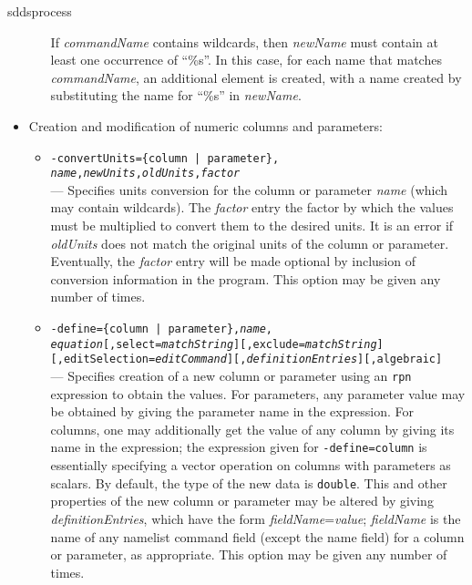 \begin{sddsprog}{sddsprocess}
\begin{itemize}
\begin{itemize}
        If {\em commandName} contains wildcards, then {\em newName} must contain at least one occurrence of
``\%s''.   In this case, for each name that matches {\em commandName}, an additional element is created, with a
name created by substituting the name for ``\%s'' in {\em newName}.

 
         \end{itemize}
 
    \item Creation and modification of numeric columns and parameters: \\

        \begin{itemize}

        \item {\tt -convertUnits=\{column | parameter\},{\em
name},{\em newUnits},}{\tt {\em oldUnits},{\em factor}}\\ ---
Specifies units conversion for the column or parameter {\em name}
(which may contain wildcards).  The {\em factor} entry the factor by
which the values must be multiplied to convert them to the desired
units.  It is an error if {\em oldUnits} does not match the original
units of the column or parameter.  Eventually, the {\em factor} entry
will be made optional by inclusion of conversion information in the
program.  This option may be given any number of times.

        \item {\tt -define=\{column | parameter\},{\em name},{\em
equation}[,select={\em matchString}][,exclude={\em matchString}]} 
{\tt [,editSelection={\em editCommand}][,{\em definitionEntries}][,algebraic] }\\ --- Specifies
creation of a new column or parameter using an {\tt rpn} expression to
obtain the values.  For parameters, any parameter value may be
obtained by giving the parameter name in the expression.  For columns,
one may additionally get the value of any column by giving its name in
the expression; the expression given for {\tt -define=column} is
essentially specifying a vector operation on columns with parameters
as scalars.  By default, the type of the new data is \verb|double|.
This and other properties of the new column or parameter may be
altered by giving {\em definitionEntries}, which have the form {\em
fieldName}={\em value}; {\em fieldName} is the name of any namelist
command field (except the name field) for a column or parameter, as
appropriate.  This option may be given any number of times.


\end{itemize}
\end{itemize}
\end{sddsprog}
